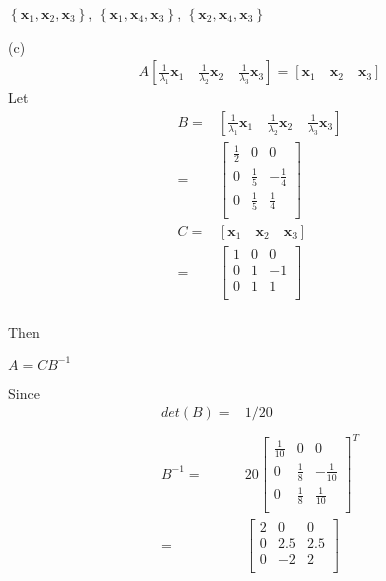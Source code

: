 \documentclass[12pt]{article}
\begin{document}
\begin{center}
$\left \{ \boldsymbol{x}_{1}, \boldsymbol{x}_{2}, \boldsymbol{x}_{3}  \right \}$, $\left \{ \boldsymbol{x}_{1}, \boldsymbol{x}_{4}, \boldsymbol{x}_{3}  \right \}$, $\left \{ \boldsymbol{x}_{2}, \boldsymbol{x}_{4}, \boldsymbol{x}_{3}  \right \}$
\end{center}
(c)
\begin{eqnarray*}
A\left[ \frac{1}{\lambda_{1}}\boldsymbol{x}_{1} \quad   \frac{1}{\lambda_{2}}\boldsymbol{x}_{2}  \quad   \frac{1}{\lambda_{3}}\boldsymbol{x}_{3} \right]
= \left[\boldsymbol{x}_{1} \quad  \boldsymbol{x}_{2}  \quad \boldsymbol{x}_{3} \right] 
\end{eqnarray*}
Let
\begin{eqnarray*}
B =& \left[ \frac{1}{\lambda_{1}}\boldsymbol{x}_{1} \quad   \frac{1}{\lambda_{2}}\boldsymbol{x}_{2}  \quad   \frac{1}{\lambda_{3}}\boldsymbol{x}_{3} \right]\\
=
& \begin{bmatrix}
\frac{1}{2}&  0&    0\\
0&  \frac{1}{5}&   -\frac{1}{4}\\
0&  \frac{1}{5}&    \frac{1}{4}\\
\end{bmatrix}\\
C=& \left[   \boldsymbol{x}_{1} \quad \boldsymbol{x}_{2} \quad \boldsymbol{x}_{3}    \right] \\
=
&\begin{bmatrix}
1&  0&  0\\
0&  1&  -1\\
0&  1&   1\\
\end{bmatrix}
\end{eqnarray*}\\
Then\\
\begin{center}
$A = CB^{-1}$
\end{center}
Since
\begin{eqnarray*}
det(B)=&1/20\\
\\
B^{-1}=&20
\begin{bmatrix}
\frac{1}{10}&  0&    0\\
0&  \frac{1}{8}&   -\frac{1}{10}\\
0&  \frac{1}{8}&    \frac{1}{10}\\
\end{bmatrix}^{T}\\
=
&\begin{bmatrix}
2&  0&  0\\
0&  2.5&  2.5\\
0&  -2&   2\\
\end{bmatrix}
\end{eqnarray*}
\end{document}
